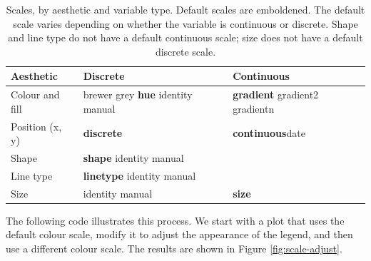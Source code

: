 \begin{table}
  \begin{center}
  \begin{tabular}{p{1in}p{1in}p{1in}}
    \toprule
    Aesthetic & Discrete & Continuous \\
    \midrule
    Colour and fill & brewer \newline grey \newline \textbf{hue} \newline identity \newline manual & \textbf{gradient} \newline gradient2 \newline gradientn \\[0.5em]
    Position (x, y) & \textbf{discrete} & \textbf{continuous}\newline date \\[0.5em]
    Shape & \textbf{shape} \newline identity \newline manual  \\[0.5em]
    Line type & \textbf{linetype} \newline identity \newline manual \\[0.5em]
    Size & identity \newline manual & \textbf{size} \\
    \bottomrule
  \end{tabular}
  \end{center}
  \caption{Scales, by aesthetic and variable type.  Default scales are emboldened. The default scale varies depending on whether the variable is continuous or discrete.  Shape and line type do not have a default continuous scale; size does not have a default discrete scale.}
  \label{tbl:default-scales}
\end{table}

The following code illustrates this process. We start with a plot that
uses the default colour scale, modify it to adjust the appearance of the
legend, and then use a different colour scale. The results are shown in
Figure \ref{fig:scale-adjust}.

